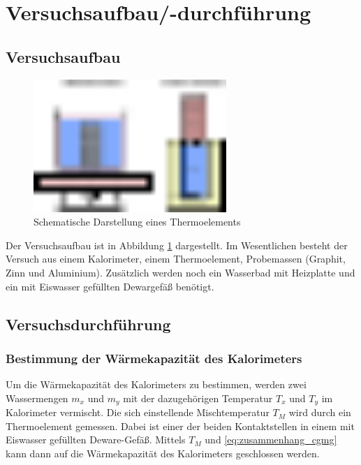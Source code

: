 \section{Versuchsaufbau/-durchführung}

\subsection{Versuchsaufbau}
\begin{figure}
  \centering
  \includegraphics[width=0.65\textwidth]{bilder/versuchsaufbau_dulon_peptip.pdf}
  \caption{Schematische Darstellung eines Thermoelements}
  \label{fig:aufbau}
\end{figure}
Der Versuchsaufbau ist in Abbildung \ref{fig:aufbau} dargestellt.
Im Wesentlichen besteht der Versuch aus einem Kalorimeter, einem Thermoelement, %
Probemassen (Graphit, Zinn und Aluminium). %
Zusätzlich werden noch ein Wasserbad mit Heizplatte und
ein mit Eiswasser gefüllten Dewargefäß benötigt.

\subsection{Versuchsdurchführung}

\subsubsection{Bestimmung der Wärmekapazität des Kalorimeters}
Um die Wärmekapazität des Kalorimeters zu bestimmen, werden
zwei Wassermengen $m_x$ und $m_y$ mit der dazugehörigen Temperatur $T_x$ und $T_y$
im Kalorimeter vermischt.
Die sich einstellende Mischtemperatur $T_M$ wird durch ein Thermoelement gemessen.
Dabei ist einer der beiden Kontaktstellen %
in einem mit Eiswasser gefüllten Deware-Gefäß.
Mittels $T_M$ und \eqref{eq:zusammenhang_cgmg} kann dann auf die Wärmekapazität des
Kalorimeters geschlossen werden. %

